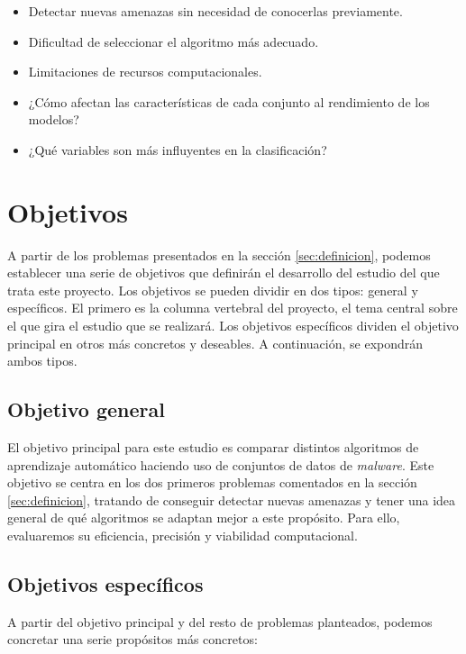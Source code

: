 \begin{itemize}
	\item Detectar nuevas amenazas sin necesidad de conocerlas previamente.
	\item Dificultad de seleccionar el algoritmo más adecuado.
	\item Limitaciones de recursos computacionales.
	\item ¿Cómo afectan las características de cada conjunto al rendimiento de los modelos?
	\item ¿Qué variables son más influyentes en la clasificación?
\end{itemize}

\section{Objetivos}
\label{sec:objetivos}

A partir de los problemas presentados en la sección \ref{sec:definicion}, podemos establecer una serie de objetivos que definirán el desarrollo del estudio del que trata este proyecto. Los objetivos se pueden dividir en dos tipos: general y específicos. El primero es la columna vertebral del proyecto, el tema central sobre el que gira el estudio que se realizará. Los objetivos específicos dividen el objetivo principal en otros más concretos y deseables. A continuación, se expondrán ambos tipos.

\subsection{Objetivo general}
\label{subsec:obj_gen}

El objetivo principal para este estudio es comparar distintos algoritmos de aprendizaje automático haciendo uso de conjuntos de datos de \textit{malware}. Este objetivo se centra en los dos primeros problemas comentados en la sección \ref{sec:definicion}, tratando de conseguir detectar nuevas amenazas y tener una idea general de qué algoritmos se adaptan mejor a este propósito. Para ello, evaluaremos su eficiencia, precisión y viabilidad computacional.

\newpage
\subsection{Objetivos específicos}
\label{subsec:obj_esp}

A partir del objetivo principal y del resto de problemas planteados, podemos concretar una serie propósitos más concretos:

